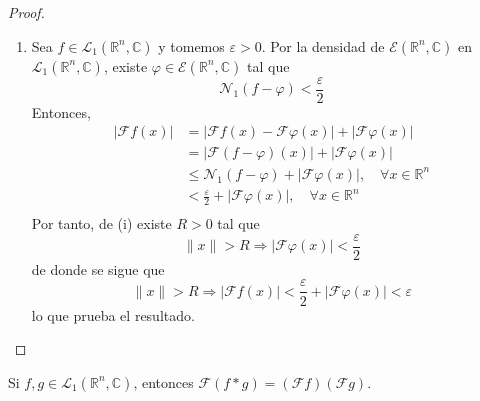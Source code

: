 \documentclass[12pt]{report}
\newcounter{it}
\theoremstyle{largebreak}
\renewcommand{\leq}{\ensuremath{\leqslant}}
\newcommand\abs[1]{\ensuremath{\left|#1\right|}}
\newcommand\norm[1]{\ensuremath{\|#1\|}}
\newcommand{\N}[2]{\ensuremath{\mathcal{N}_{#1}\left(#2\right)}}
\newcommand{\fou}[1]{\ensuremath{\mathcal{F}#1}}
\begin{document}
\begin{proof}
\begin{enumerate}
            \item Sea $f\in\mathcal{L}_1(\mathbb{R}^n,\mathbb{C})$ y tomemos $\varepsilon>0$. Por la densidad de $\mathcal{E}(\mathbb{R}^n,\mathbb{C})$ en $\mathcal{L}_1(\mathbb{R}^n,\mathbb{C})$, existe $\varphi\in\mathcal{E}(\mathbb{R}^n,\mathbb{C})$ tal que
            \begin{equation*}
                \N{1}{f-\varphi}<\frac{\varepsilon}{2}
            \end{equation*}
            Entonces,
            \begin{equation*}
                \begin{split}
                    \abs{\fou{f}(x)}&=\abs{\fou{f}(x)-\fou{\varphi}(x)}+\abs{\fou{\varphi}(x)}\\
                    &=\abs{\fou{(f-\varphi)}(x)}+\abs{\fou{\varphi}(x)}\\
                    &\leq\N{1}{f-\varphi}+\abs{\fou{\varphi}(x)},\quad\forall x\in\mathbb{R}^n \\
                    &<\frac{\varepsilon}{2}+\abs{\fou{\varphi}(x)},\quad\forall x\in\mathbb{R}^n \\
                \end{split}
            \end{equation*}
            Por tanto, de (i) existe $R>0$ tal que
            \begin{equation*}
                \norm{x}>R\Rightarrow\abs{\fou{\varphi}(x)}<\frac{\varepsilon}{2}
            \end{equation*}
            de donde se sigue que
            \begin{equation*}
                \norm{x}>R\Rightarrow\abs{\fou{f}(x)}<\frac{\varepsilon}{2}+\abs{\fou{\varphi}(x)}<\varepsilon
            \end{equation*}
            lo que prueba el resultado.
        \end{enumerate}
    \end{proof}

    \begin{theor}
        Si $f,g\in\mathcal{L}_1(\mathbb{R}^n,\mathbb{C})$, entonces $\fou{(f*g)}=(\fou{f})(\fou{g})$.
    \end{theor}
\end{document}
